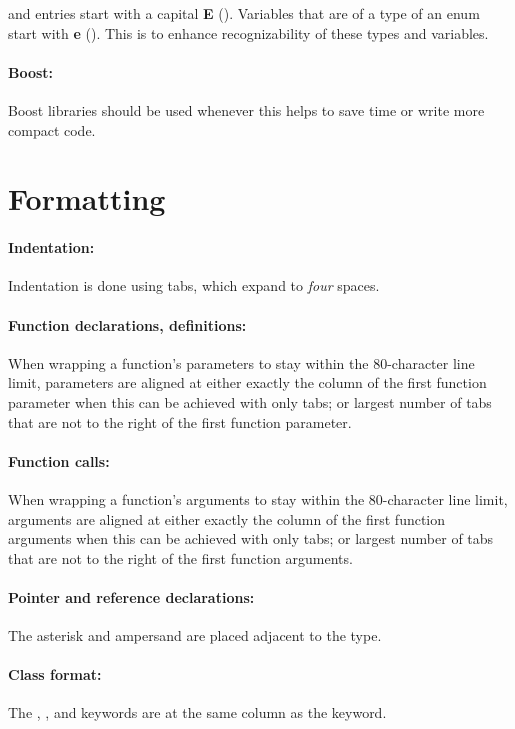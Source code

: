 \documentclass[footinclude=false,11pt,DIV11]{scrartcl}
\begin{document}
and entries start with a capital
\textbf{E} (\Etype). Variables that are of a type of an enum start with \textbf{e}
(\etype). This is to enhance recognizability of these types and variables.

\paragraph{Boost:} Boost libraries should be used whenever this helps to save time or
write more compact code.


\section{Formatting}

\paragraph{Indentation:} Indentation is done using tabs, which expand to \emph{four}
spaces.

\paragraph{Function declarations, definitions:} When wrapping a function's parameters
to stay within the 80-character line limit, parameters are aligned at either exactly
the column of the first function parameter when this can be achieved with only tabs; or
largest number of tabs that are not to the right of the first function parameter.

\paragraph{Function calls:} When wrapping a function's arguments to stay within the
80-character line limit, arguments are aligned at either exactly the column of the
first function arguments when this can be achieved with only tabs; or largest number of
tabs that are not to the right of the first function arguments.

\paragraph{Pointer and reference declarations:} The asterisk and ampersand are placed
adjacent to the type.

\paragraph{Class format:} The , , and 
keywords are at the same column as the  keyword.
\end{document}

